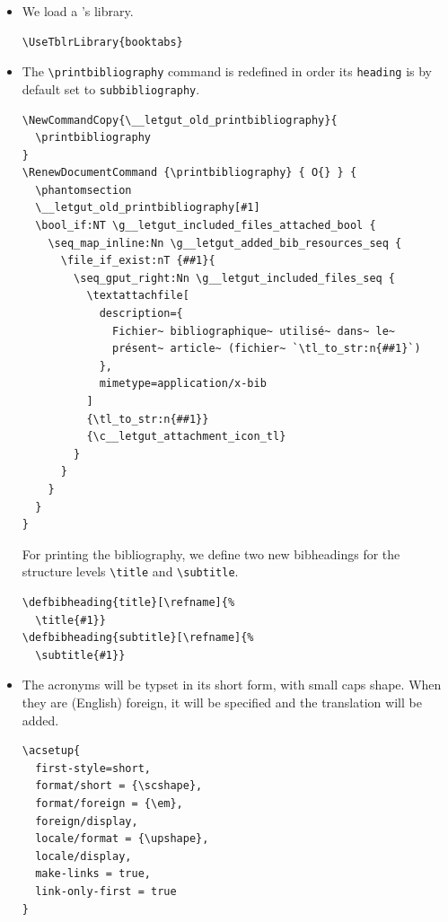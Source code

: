 \documentclass{letgut}
\begin{document}
\begin{itemize}
\begin{itemize}
\begin{lstlisting}
\floatsetup{objectset=justified}
\floatsetup[figure]{
  margins=hangleft,
  capposition=beside,
  capbesideposition={top,left},
  floatwidth=0.85\textwidth
}
\floatsetup[table]{
  % style=__letgut_ruled,
  margins=hangleft,
  capposition=beside,
  capbesideposition={top,left},
  floatwidth=0.85\textwidth
}
\hook_gput_code:nnn { env/figure/before } { . }{%
  \renewcommand\FBaskip{.5cm plus .1cm minus .5cm}%
  \renewcommand\FBbskip{.5cm plus .1cm minus .5cm}%
}
\hook_gput_code:nnn { env/table/before } { . }{%
  \renewcommand\FBaskip{.5cm plus .1cm minus .5cm}%
  \renewcommand\FBbskip{.5cm plus .1cm minus .5cm}%
}
% \floatsetup[table]{capposition=top}
\end{lstlisting}
\end{itemize}
Moreover, the tables will be entitled \enquote{tableau} instead of
\enquote{table}.
\begin{lstlisting}
\renewcommand*\frenchtablename{Tableau}
\end{lstlisting}
\item We load a 's library.
\begin{lstlisting}
\UseTblrLibrary{booktabs}
\end{lstlisting}
\item The \lstinline+\printbibliography+ command is redefined in order its \lstinline+heading+ is by
default set to \lstinline+subbibliography+.
\begin{lstlisting}
\NewCommandCopy{\__letgut_old_printbibliography}{
  \printbibliography
}
\RenewDocumentCommand {\printbibliography} { O{} } {
  \phantomsection
  \__letgut_old_printbibliography[#1]
  \bool_if:NT \g__letgut_included_files_attached_bool {
    \seq_map_inline:Nn \g__letgut_added_bib_resources_seq {
      \file_if_exist:nT {##1}{
        \seq_gput_right:Nn \g__letgut_included_files_seq {
          \textattachfile[
            description={
              Fichier~ bibliographique~ utilisé~ dans~ le~
              présent~ article~ (fichier~ `\tl_to_str:n{##1}`)
            },
            mimetype=application/x-bib
          ]
          {\tl_to_str:n{##1}}
          {\c__letgut_attachment_icon_tl}
        }
      }
    }
  }
}
\end{lstlisting}
 For printing the bibliography, we define two new bibheadings for the
structure levels \lstinline+\title+ and \lstinline+\subtitle+.
\begin{lstlisting}
\defbibheading{title}[\refname]{%
  \title{#1}}
\defbibheading{subtitle}[\refname]{%
  \subtitle{#1}}
\end{lstlisting}
\item The acronyms will be typset in its short form, with small caps shape. When they are
(English) foreign, it will be specified and the translation will be added.
\begin{lstlisting}
\acsetup{
  first-style=short,
  format/short = {\scshape},
  format/foreign = {\em},
  foreign/display,
  locale/format = {\upshape},
  locale/display,
  make-links = true,
  link-only-first = true
}
\end{lstlisting}


\end{itemize}
\end{document}
